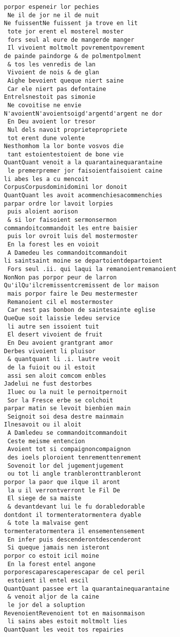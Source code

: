 \documentclass[
  letterpaper,
  DIV=11,
  numbers=noendperiod]{scrreprt}
\begin{document}
\begin{verbatim}
porpor espeneir lor pechies
 Ne il de jor ne il de nuit
Ne fuissentNe fuissent ja trove en lit
 tote jor erent el mosterel moster
 fors seul al eure de mangerde manger
 Il vivoient moltmolt povrementpovrement
de painde paindorge & de polmentpolment
 & tos les venredis de lan
 Vivoient de nois & de glan
 Aighe bevoient queque niert saine
 Car ele niert pas defontaine
Entrelsnestoit pas simonie
 Ne covoitise ne envie
N'avoientN'avoientsoigd'argentd'argent ne dor
 En Deu avoient lor tresor
 Nul dels navoit proprietepropriete
 tot erent dune volente
Nesthomhom la lor bonte vosvos die
 tant estoientestoient de bone vie
QuantQuant venoit a la quarantainequarantaine
 le premerpremer jor faisoientfaisoient caine
li abes les a cu mencoit
CorpusCorpusdominidomini lor donoit
QuantQuant les avoit acommenchiesacommenchies
parpar ordre lor lavoit lorpies
 puis aloient aorison
 & si lor faisoient sermonsermon
commandoitcommandoit les entre baisier
 puis lor ovroit luis del mostermoster
 En la forest les en voioit
 A Damedeu les commandoitcommandoit
li saintsaint moine se departoientdepartoient
 Fors seul .ii. qui laqui la remanoientremanoient
NonNon pas porpor peur de larron
Qu'ilQu'ilcremissentcremissent de lor maison
 mais porpor faire le Deu mestermester
 Remanoient cil el mostermoster
 Car nest pas bonbon de saintesainte eglise
QueQue soit laissie ledeu service
 li autre sen issoient tuit
 El desert vivoient de fruit
 En Deu avoient grantgrant amor
Derbes vivoient li pluisor
 & quantquant li .i. lautre veoit
 de la fuioit ou il estoit
 assi sen aloit comcom enbles
Jadelui ne fust destorbes
 Iluec ou la nuit le pernoitpernoit
 Sor la Fresce erbe se colchoit
parpar matin se levoit bienbien main
 Seignoit soi desa destre mainmain
Ilnesavoit ou il aloit
 A Damledeu se commandoitcommandoit
 Ceste meisme entencion
 Avoient tot si compaignoncompaignon
 des ioels ploroient tenrementtenrement
 Sovenoit lor del jugementjugement
 ou tot li angle tranbleronttranbleront
porpor la paor que ilque il aront
 la u il verrontverront le Fil De
 El siege de sa maiste
 & devantdevant lui le fu dorabledorable
dontdont il tormenteratormentera dyable
 & tote la malvaise gent
tormenteratormentera il ensementensement
 En infer puis descenderontdescenderont
 Si queque jamais nen isteront
porpor co estoit icil moine
 En la forest entel angone
porporescaparescaperescapar de cel peril
 estoient il entel escil
QuantQuant passee ert la quarantainequarantaine
 & venoit aljor de la caine
 le jor del a soluption
RevenoientRevenoient tot en maisonmaison
 li sains abes estoit moltmolt lies
QuantQuant les veoit tos repairies

\end{verbatim}
\end{document}
